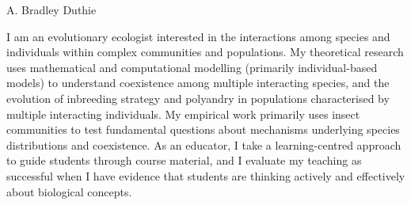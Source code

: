 \documentclass[letterpaper]{article}
\def\name{A. Bradley Duthie}
\begin{document}
\thispagestyle{specialfooter}


{\huge \name}

\hrulefill

\vspace{0.06in}


I am an evolutionary ecologist interested in the interactions among species and individuals within complex communities and populations. My theoretical research uses mathematical and computational modelling (primarily individual-based models) to understand coexistence among multiple interacting species, and the evolution of inbreeding strategy and polyandry in populations characterised by multiple interacting individuals. My empirical work primarily uses insect communities to test fundamental questions about mechanisms underlying species distributions and coexistence. As an educator, I take a learning-centred approach to guide students through course material, and I evaluate my teaching as successful when I have evidence that students are thinking actively and effectively about biological concepts.



\hrulefill

\vspace{0.25in}

\end{document}
